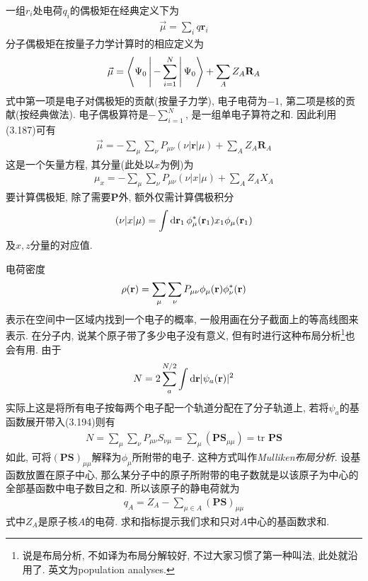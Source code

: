 一组$r_i$处电荷$q_i$的偶极矩在经典定义下为
\begin{align}
\vec{\mu} = \sum_i q\mathbf{r}_i
\end{align}
分子偶极矩在按量子力学计算时的相应定义为
\begin{align}
\vec{\mu} = \Braket{\Psi_0|-\sum_{i=1}^{N}|\Psi_0} + \sum_AZ_A\mathbf{R}_A
\end{align}
式中第一项是电子对偶极矩的贡献(按量子力学), 电子电荷为$-1$, 第二项是核的贡献(按经典做法). 电子偶极算符是$-\sum_{i=1}^{N}$, 是一组单电子算符之和. 因此利用(3.187)可有
\begin{align}
\vec{\mu} = -\sum_\mu\sum_\nu P_{\mu\nu}(\nu|\mathbf{r}|\mu) + \sum_AZ_A\mathbf{R}_A
\end{align}
这是一个矢量方程, 其分量(此处以$x$为例)为
\begin{align}
\mu_x = -\sum_\mu\sum_\nu P_{\mu\nu}(\nu|x|\mu) + \sum_AZ_AX_A
\end{align}
要计算偶极矩, 除了需要$\mathbf{P}$外, 额外仅需计算偶极积分
\begin{align}
(\nu|x|\mu) = \int\dd{r}_1\,\phi_\mu^*(\bfr_1)x_1\phi_\mu(\bfr_1)
\end{align}
及$x,z$分量的对应值.

电荷密度
\begin{align}
\rho(\mathbf{r}) = \sum_\mu\sum_\nu P_{\mu\nu}\phi_\mu(\mathbf{r})\phi_\nu^*(\mathbf{r})
\end{align}
表示在空间中一区域内找到一个电子的概率, 一般用画在分子截面上的等高线图来表示. 在分子内, 说某个原子带了多少电子没有意义, 但有时进行这种布局分析\footnote{
说是布局分析, 不如译为布局分解较好, 不过大家习惯了第一种叫法, 此处就沿用了. 英文为population analyses.
}也会有用. 由于
\begin{align}
N = 2\sum_{a}^{N/2}\int\dd{r}|\psi_a(\bfr)|^2
\end{align}
实际上这是将所有电子按每两个电子配一个轨道分配在了分子轨道上, 若将$\psi_a$的基函数展开带入(3.194)则有
\begin{align}
N = \sum_\mu\sum_\nu P_{\mu\nu}S_{\nu\mu} = \sum_\mu(\mathbf{PS}_{\mu\mu}) = \mathrm{tr}\,\,\mathbf{PS}
\end{align}
如此, 可将$(\mathbf{PS})_{\mu\mu}$解释为$\phi_\mu$所附带的电子. 这种方式叫作\emph{Mulliken布局分析}. 设基函数放置在原子中心, 那么某分子中的原子所附带的电子数就是以该原子为中心的全部基函数中电子数目之和. 所以该原子的静电荷就为
\begin{align}
q_A = Z_A - \sum_{\mu\in A}(\mathbf{PS})_{\mu\mu}
\end{align}
式中$Z_A$是原子核$A$的电荷. 求和指标提示我们求和只对$A$中心的基函数求和.

